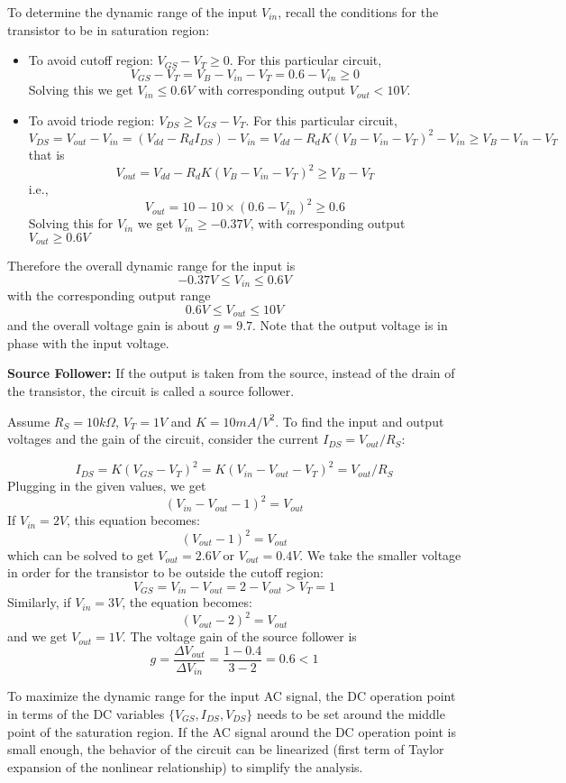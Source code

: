To determine the dynamic range of the input $V_{in}$, recall the conditions for the
transistor to be in saturation region:
\begin{itemize}
\item To avoid cutoff region: $V_{GS}-V_T \ge 0$. For this particular circuit, 
  \[ V_{GS}-V_T=V_B-V_{in}-V_T=0.6-V_{in} \ge 0 \]
  Solving this we get $V_{in} \le 0.6V$ with corresponding output $V_{out} < 10V$.

\item To avoid triode region: $V_{DS} \ge V_{GS}-V_T$. For this particular circuit, 
\[  V_{DS}=V_{out}-V_{in}=(V_{dd}-R_dI_{DS})-V_{in}
    =V_{dd}-R_dK (V_B-V_{in}-V_T)^2-V_{in} \ge V_B-V_{in}-V_T  \]
that is
\[  V_{out}=V_{dd}-R_dK (V_B-V_{in}-V_T)^2 \ge V_B-V_T \]
i.e.,
\[  V_{out}=10-10\times (0.6-V_{in})^2 \ge 0.6 \]
Solving this for $V_{in}$ we get $V_{in} \ge -0.37V $, with corresponding output
$V_{out} \ge 0.6V$
\end{itemize}
Therefore the overall dynamic range for the input is 
\[ -0.37V \le V_{in} \le 0.6V \]
with the corresponding output range
\[  0.6V \le V_{out} \le 10V  \]
and the overall voltage gain is about $g=9.7$. Note that the output voltage is in
phase with the input voltage.

{\bf Source Follower: } If the output is taken from the source, instead of the 
drain of the transistor, the circuit is called a source follower. 


Assume $R_S=10 k\Omega$, $V_T=1V$ and $K=10 mA/V^2$. To find the input and output 
voltages and the gain of the circuit, consider the current $I_{DS}=V_{out}/R_S$:

\[ I_{DS}=K(V_{GS}-V_T)^2=K(V_{in}-V_{out}-V_T)^2=V_{out}/R_S \]
Plugging in the given values, we get
\[ (V_{in}-V_{out}-1)^2=V_{out} \]
If $V_{in}=2V$, this equation becomes:
\[ (V_{out}-1)^2=V_{out} \]
which can be solved to get $V_{out}=2.6V$ or $V_{out}=0.4V$. We take the smaller 
voltage in order for the transistor to be outside the cutoff region:
\[ V_{GS}=V_{in}-V_{out}=2-V_{out}>V_T=1 \]
Similarly, if $V_{in}=3V$, the equation becomes:
\[ (V_{out}-2)^2=V_{out} \]
and we get $V_{out}=1V$. The voltage gain of the source follower is 
\[ g=\frac{\Delta V_{out}}{\Delta V_{in}}=\frac{1-0.4}{3-2}=0.6<1 \]

To maximize the dynamic range for the input AC signal, the DC operation point
in terms of the DC variables $\{V_{GS}, I_{DS}, V_{DS}\}$ needs to be set around
the middle point of the saturation region. If the AC signal around the DC 
operation point is small enough, the behavior of the circuit can be linearized
(first term of Taylor expansion of the nonlinear relationship) to simplify the
analysis. 

